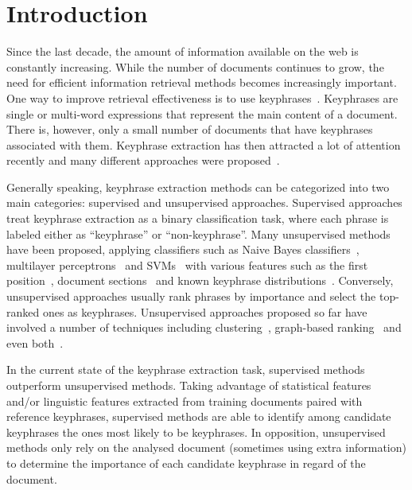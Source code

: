 \section{Introduction}
\label{sec:introduction}
  Since the last decade, the amount of information available on the web is
  constantly increasing. While the number of documents continues to grow, the
  need for efficient information retrieval methods becomes increasingly
  important. One way to improve retrieval effectiveness is to use
  keyphrases~\cite{jones1999phrasier}. Keyphrases are single or multi-word
  expressions that represent the main content of a document. There is, however,
  only a small number of documents that have keyphrases associated with them.
  Keyphrase extraction has then attracted a lot of attention recently and many
  different approaches were proposed~\cite{hasan2014state_of_the_art}.

  Generally speaking, keyphrase extraction methods can be categorized into two
  main categories: supervised and unsupervised approaches. Supervised approaches
  treat keyphrase extraction as a binary classification task, where each phrase
  is labeled either as ``keyphrase'' or ``non-keyphrase''. Many unsupervised
  methods have been proposed, applying classifiers such as Naive Bayes
  classifiers~\cite{witten1999kea}, multilayer
  perceptrons~\cite{sarkar2010neuralnetwork} and SVMs~\cite{zhang2006svm} with
  various features such as the first position~\cite{witten1999kea}, document
  sections~\cite{nguyen2007keadocumentstructure} and known keyphrase
  distributions~\cite{frank1999keafrequency}. Conversely, unsupervised
  approaches usually rank phrases by importance and select the top-ranked ones
  as keyphrases. Unsupervised approaches proposed so far have involved a number
  of techniques including clustering~\cite{liu2009keycluster}, graph-based
  ranking~\cite{mihalcea2004textrank} and even
  both~\cite{bougouin2013topicrank}.

  In the current state of the keyphrase extraction task, supervised methods
  outperform unsupervised methods. Taking advantage of statistical features
  and/or linguistic features extracted from training documents paired with
  reference keyphrases, supervised methods are able to identify among candidate
  keyphrases the ones most likely to be keyphrases. In opposition, unsupervised
  methods only rely on the analysed document (sometimes using extra information)
  to determine the importance of each candidate keyphrase in regard of the
  document.

